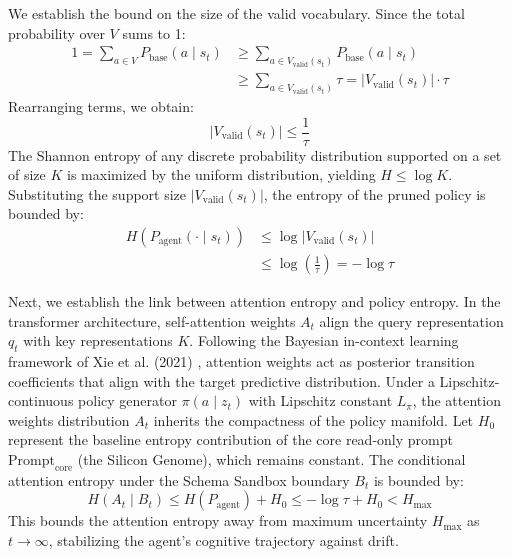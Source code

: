 \documentclass[10pt,journal,compsoc]{IEEEtran}
\begin{document}
We establish the bound on the size of the valid vocabulary. Since the total probability over $V$ sums to 1:
\begin{equation}
\begin{split}
1 = \sum_{a \in V} P_{\text{base}}(a \mid s_t) &\ge \sum_{a \in V_{\text{valid}}(s_t)} P_{\text{base}}(a \mid s_t) \\
&\ge \sum_{a \in V_{\text{valid}}(s_t)} \tau = |V_{\text{valid}}(s_t)| \cdot \tau
\end{split}
\end{equation}
Rearranging terms, we obtain:
\begin{equation}
|V_{\text{valid}}(s_t)| \le \frac{1}{\tau}
\end{equation}
The Shannon entropy of any discrete probability distribution supported on a set of size $K$ is maximized by the uniform distribution, yielding $H \le \log K$. Substituting the support size $|V_{\text{valid}}(s_t)|$, the entropy of the pruned policy is bounded by:
\begin{equation}
\begin{split}
H(P_{\text{agent}}(\cdot \mid s_t)) &\le \log |V_{\text{valid}}(s_t)| \\
&\le \log \left(\frac{1}{\tau}\right) = -\log \tau
\end{split}
\end{equation}

Next, we establish the link between attention entropy and policy entropy. In the transformer architecture, self-attention weights $A_t$ align the query representation $q_t$ with key representations $K$. Following the Bayesian in-context learning framework of Xie et al. (2021) \cite{xie2021}, attention weights act as posterior transition coefficients that align with the target predictive distribution. Under a Lipschitz-continuous policy generator $\pi(a \mid z_t)$ with Lipschitz constant $L_{\pi}$, the attention weights distribution $A_t$ inherits the compactness of the policy manifold. Let $H_0$ represent the baseline entropy contribution of the core read-only prompt $\text{Prompt}_{\text{core}}$ (the Silicon Genome), which remains constant. The conditional attention entropy under the Schema Sandbox boundary $B_t$ is bounded by:
\begin{equation}
H(A_t \mid B_t) \le H(P_{\text{agent}}) + H_0 \le -\log \tau + H_0 < H_{\max}
\end{equation}
This bounds the attention entropy away from maximum uncertainty $H_{\max}$ as $t \to \infty$, stabilizing the agent's cognitive trajectory against drift.
\end{document}
